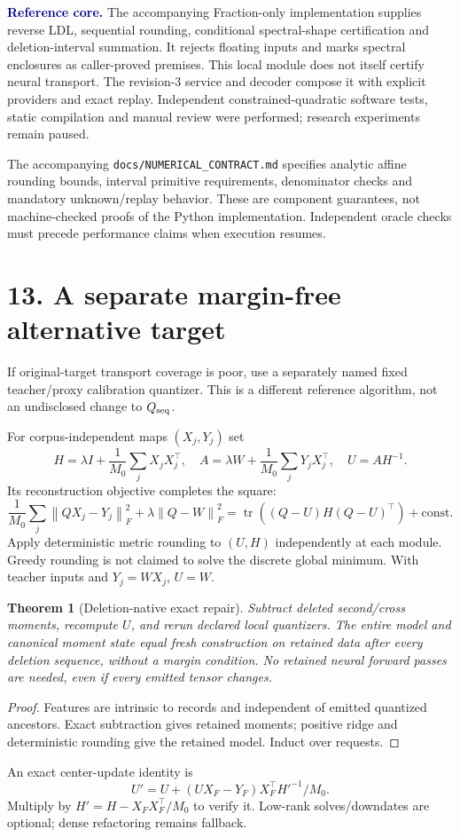 \documentclass[11pt]{article}
\newtheorem{theorem}{Theorem}\newtheorem{lemma}{Lemma}\newtheorem{corollary}{Corollary}
\newcommand{\norm}[1]{\left\|#1\right\|}\newcommand{\tr}{\operatorname{tr}}
\newcommand{\note}[1]{\textcolor{navy}{\textbf{#1}}}
\begin{document}
\note{Reference core.} The accompanying Fraction-only implementation supplies reverse LDL, sequential rounding, conditional spectral-shape certification and deletion-interval summation. It rejects floating inputs and marks spectral enclosures as caller-proved premises. This local module does not itself certify neural transport. The revision-3 service and decoder compose it with explicit providers and exact replay. Independent constrained-quadratic software tests, static compilation and manual review were performed; research experiments remain paused.

The accompanying \texttt{docs/NUMERICAL\_CONTRACT.md} specifies analytic affine rounding bounds, interval primitive requirements, denominator checks and mandatory unknown/replay behavior. These are component guarantees, not machine-checked proofs of the Python implementation. Independent oracle checks must precede performance claims when execution resumes.

\newpage
\section*{13. A separate margin-free alternative target}
If original-target transport coverage is poor, use a separately named fixed teacher/proxy calibration quantizer. This is a different reference algorithm, not an undisclosed change to $Q_{\rm seq}$.

For corpus-independent maps $(X_j,Y_j)$ set
\[
 H=\lambda I+\frac1{M_0}\sum_jX_jX_j^{\top},\quad
 A=\lambda W+\frac1{M_0}\sum_jY_jX_j^{\top},\quad U=AH^{-1}.
\]
Its reconstruction objective completes the square:
\[
 \frac1{M_0}\sum_j\norm{QX_j-Y_j}_F^2+\lambda\norm{Q-W}_F^2
 =\tr((Q-U)H(Q-U)^{\top})+\mathrm{const}.
\]
Apply deterministic metric rounding to $(U,H)$ independently at each module. Greedy rounding is not claimed to solve the discrete global minimum. With teacher inputs and $Y_j=WX_j$, $U=W$.

\begin{theorem}[Deletion-native exact repair]
Subtract deleted second/cross moments, recompute $U$, and rerun declared local quantizers. The entire model and canonical moment state equal fresh construction on retained data after every deletion sequence, without a margin condition. No retained neural forward passes are needed, even if every emitted tensor changes.
\end{theorem}
\begin{proof}
Features are intrinsic to records and independent of emitted quantized ancestors. Exact subtraction gives retained moments; positive ridge and deterministic rounding give the retained model. Induct over requests.
\end{proof}
An exact center-update identity is
\[
 U'=U+(UX_F-Y_F)X_F^{\top}H'^{-1}/M_0. \tag{16}
\]
Multiply by $H'=H-X_FX_F^{\top}/M_0$ to verify it. Low-rank solves/downdates are optional; dense refactoring remains fallback.
\end{document}
